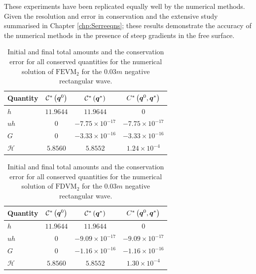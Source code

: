These experiments have been replicated equally well by the numerical methods. Given the resolution and error in conservation and the extensive study summarised in Chapter \ref{chp:Serreeqns}; these results demonstrate the accuracy of the numerical methods in the presence of steep gradients in the free surface.     
%
\begin{table}
	\centering
	\begin{tabular}{l  c  c c}
		Quantity& $\mathcal{C}^*\left(\boldsymbol{q}^0\right)$ & $\mathcal{C}^*\left(\boldsymbol{q}^*\right)$ & ${C}^*\left(\boldsymbol{q}^0,\boldsymbol{q}^*\right)$ \B \\
		\hline 
		$h$ & $11.9644$ & $11.9644$ & $0$ \T\\
		$uh$ & $0$ & $-7.75 \times 10^{-17}$ & $-7.75\times 10^{-17}$\\
		$G$ & $0$ & $-3.33\times 10^{-16}$ & $-3.33\times 10^{-16}$\\
		$\mathcal{H}$ & $5.8560$ & $5.8552$ & $1.24 \times 10^{-4}$  \B \\
		\hline
	\end{tabular}
	\caption{Initial and final total amounts and the conservation error for all conserved quantities for the numerical solution of $\text{FEVM}_2$ for the $0.03m$ negative rectangular wave.}
	\label{tab:ConservationSegurFEVM3cm}
\end{table} 
%
\begin{table}
	\centering
	\begin{tabular}{l  c  c c}
		Quantity& $\mathcal{C}^*\left(\boldsymbol{q}^0\right)$ & $\mathcal{C}^*\left(\boldsymbol{q}^*\right)$ & ${C}^*\left(\boldsymbol{q}^0,\boldsymbol{q}^*\right)$ \B \\
		\hline
		$h$ & $11.9644$ & $11.9644$ & $0$ \T\\
		$uh$ & $0$ & $-9.09 \times 10^{-17}$ & $-9.09 \times 10^{-17}$\\
		$G$ & $0$ & $-1.16\times 10^{-16}$ & $-1.16\times 10^{-16}$\\
		$\mathcal{H}$ & $5.8560$ & $5.8552$ & $1.30 \times 10^{-4}$ \B\\
		\hline
	\end{tabular}
	\caption{Initial and final total amounts and the conservation error for all conserved quantities for the numerical solution of $\text{FDVM}_2$ for the $0.03m$ negative rectangular wave.}
	\label{tab:ConservationSegurFDVM3cm}
\end{table}  

